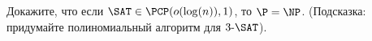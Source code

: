 Докажите, что если $\SAT \in \PCP(o(\log(n)), 1)$, то $\P = \NP$. (Подсказка: придумайте полиномиальный алгоритм для
$3\text{-}\SAT$).